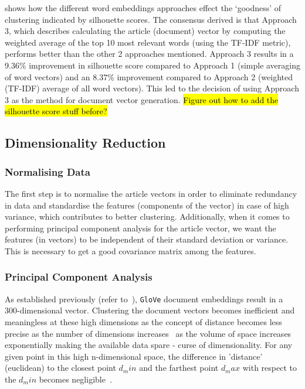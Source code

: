   \vspace{-2em}
 shows how the different word embeddings approaches effect the `goodness' of clustering indicated by silhouette scores. The consensus derived is that Approach 3, which describes calculating the article (document) vector by computing the weighted average of the top 10 most relevant words (using the TF-IDF metric), performs better than the other 2 approaches mentioned. Approach 3 results in a 9.36\% improvement in silhouette score compared to Approach 1 (simple averaging of word vectors) and an 8.37\% improvement compared to Approach 2 (weighted (TF-IDF) average of all word vectors). This led to the decision of using Approach 3 as the method for document vector generation. \hl{Figure out how to add the silhouette score stuff before?}



\subsection{Dimensionality Reduction}

\subsubsection{Normalising Data}
The first step is to normalise the article vectors in order to eliminate redundancy in data and standardise the features (components of the vector) in case of high variance, which contributes to better clustering. Additionally, when it comes to performing principal component analysis for the article vector, we want the features (in vectors) to be independent of their standard deviation or variance. This is necessary to get a good covariance matrix among the features.  

\subsubsection{Principal Component Analysis}

As established previously (refer to~), \texttt{GloVe} document embeddings result in a 300-dimensional vector. Clustering the document vectors becomes inefficient and meaningless at these high dimensions as the concept of distance becomes less precise as the number of dimensions increases~\cite{pca_clustering} as the volume of space increases exponentially making the available data spare - curse of dimensionality. For any given point in this high n-dimensional space, the difference in 'distance' (euclidean) to the closest point $d_min$ and the farthest point $d_max$ with respect to the $d_min$ becomes negligible~\cite{nearest_neighbour}. 

